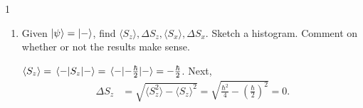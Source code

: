 \documentclass[11pt]{article}
\begin{document}
\begin{problem}{1}\hfill
\begin{enumerate}[label=(\alph*)]
  \item Given \( \ket{\psi} = \ket{-} \), find \( \langle S_z \rangle, \Delta S_z, \langle S_x \rangle, \Delta S_x \).
        Sketch a histogram.
        Comment on whether or not the results make sense.
        \begin{answer}
          \(\langle S_{z} \rangle = \ev{S_z}{-} = \ev{- \frac{\hbar}{2}}{-} = - \frac{\hbar}{2}\).
          Next,
          \begin{equation}
          \label{eq:2}
          \begin{aligned}
          \Delta S_z &= \sqrt{\langle S_{z}^2 \rangle - \langle S_z \rangle^2} = \sqrt{\frac{\hbar^2}{4} - (\frac{\hbar}{2})^2} = 0.
          \end{aligned}
        \end{equation}


\end{answer}
\end{enumerate}
\end{problem}
\end{document}
